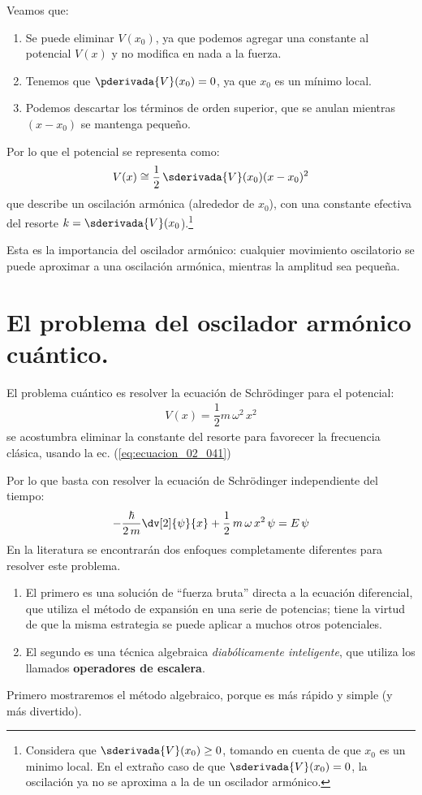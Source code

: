 Veamos que:
\begin{enumerate}
\item Se puede eliminar $V(x_{0})$, ya que podemos agregar una constante al potencial $V(x)$ y no modifica en nada a la fuerza.
\item Tenemos que $\pderivada{V}(x_{0}) = 0$, ya que $x_{0}$ es un mínimo local.
\item Podemos descartar los términos de orden superior, que se anulan mientras $(x - x_{0})$ se mantenga pequeño.
\end{enumerate}
Por lo que el potencial se representa como:
\begin{align*}
V(x) \cong \dfrac{1}{2} \, \sderivada{V} (x_{0}) (x - x_{0})^{2}
\end{align*}
que describe un oscilación armónica (alrededor de $x_{0}$), con una constante efectiva del resorte $k = \sderivada{V} (x_{0}$).\footnote{Considera que $\sderivada{V}(x_{0})\geq 0$, tomando en cuenta de que $x_{0}$ es un minimo local. En el extraño caso de que $\sderivada{V} (x_{0})= 0$, la oscilación ya no se aproxima a la de un oscilador armónico.}
\par
Esta es la importancia del oscilador armónico: cualquier movimiento oscilatorio se puede aproximar a una oscilación armónica, mientras la amplitud sea pequeña.

\section{El problema del oscilador armónico cuántico.}

El problema cuántico es resolver la ecuación de Schrödinger para el potencial:
\begin{align}
V(x) = \dfrac{1}{2} m \, \omega^{2} \, x^{2}
\label{eq:ecuacion_02_043}
\end{align}
se acostumbra eliminar la constante del resorte para favorecer la frecuencia clásica, usando la ec. (\ref{eq:ecuacion_02_041})
\par
Por lo que basta con resolver la ecuación de Schrödinger independiente del tiempo:
\begin{align}
- \dfrac{\hbar}{2 \, m} \dv[2]{\psi}{x} + \dfrac{1}{2} \, m \, \omega \, x^{2} \, \psi = E \, \psi
\label{eq:ecuacion_02_044}
\end{align}
En la literatura se encontrarán dos enfoques completamente diferentes para resolver este problema.
\begin{enumerate}
\item El primero es una solución de \enquote{fuerza bruta} directa a la ecuación diferencial, que utiliza el método de expansión en una serie de potencias; tiene la virtud de que la misma estrategia se puede aplicar a muchos otros potenciales.
\item El segundo es una técnica algebraica \emph{diabólicamente inteligente}, que utiliza los llamados \textbf{operadores de escalera}.
\end{enumerate}
Primero mostraremos el método algebraico, porque es más rápido y simple (y más divertido).

